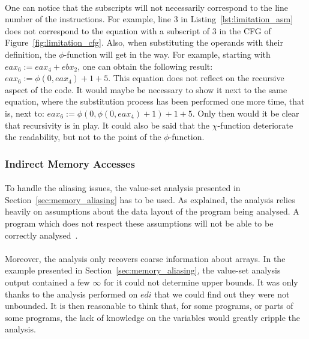 \paragraph{}
One can notice that the subscripts will not necessarily correspond to the line number of the instructions. For example, line 3 in Listing~\ref{lst:limitation_asm} does not correspond to the equation with a subscript of $3$ in the CFG of Figure~\ref{fig:limitation_cfg}. Also, when substituting the operands with their definition, the $\phi$-function will get in the way. For example, starting with $eax_6 := eax_4 + ebx_2$, one can obtain the following result: $eax_6 := \phi(0, eax_4) + 1 + 5$. This equation does not reflect on the recursive aspect of the code. It would maybe be necessary to show it next to the same equation, where the substitution process has been performed one more time, that is, next to: $eax_6 := \phi(0, \phi(0, eax_4) + 1) + 1 + 5$. Only then would it be clear that recursivity is in play. It could also be said that the $\chi$-function deteriorate the readability, but not to the point of the $\phi$-function.

\subsubsection{Indirect Memory Accesses}
\paragraph{}
To handle the aliasing issues, the value-set analysis presented in Section~\ref{sec:memory_aliasing} has to be used. As explained, the analysis relies heavily on assumptions about the data layout of the program being analysed. A program which does not respect these assumptions will not be able to be correctly analysed~\cite{balakrishnan2004analyzing}.

\paragraph{}
Moreover, the analysis only recovers coarse information about arrays. In the example presented in Section~\ref{sec:memory_aliasing}, the value-set analysis output contained a few $\infty$ for it could not determine upper bounds. It was only thanks to the analysis performed on $edi$ that we could find out they were not unbounded. It is then reasonable to think that, for some programs, or parts of some programs, the lack of knowledge on the variables would greatly cripple the analysis.
